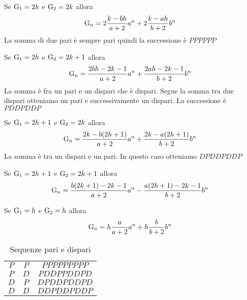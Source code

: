 \begin{commento}
	Se $\operatorname{G}_{1}={}2h$ e $\operatorname{G}_{2}={}2k$ allora \begin{equation}
		\operatorname{G}_{n}={}2\dfrac{k-bh}{a+2}a^n+2\dfrac{k-ah}{b+2}b^n
	\end{equation}
La somma di due pari è sempre pari quindi la successione è $PPPPPP$
\end{commento}
\begin{commento}
	Se $\operatorname{G}_{1}={}2h$ e $\operatorname{G}_{2}={}2k+1$ allora \begin{equation}
		\operatorname{G}_{n}={}\dfrac{2bh-2k-1}{a+2}a^n+\dfrac{2ah-2k-1}{b+2}b^n
	\end{equation}
La somma è fra un pari e un dispari che è dispari. Segue la somma tra due dispari otteniamo un pari e successivamente un dispari. La successione è $PDDPDDP$
\end{commento}
\begin{commento}
	Se $\operatorname{G}_{1}={}2h+1$ e $\operatorname{G}_{2}={}2k$ allora \begin{equation}
		\operatorname{G}_{n}={}\dfrac{2k-b(2h+1)}{a+2}a^n+\dfrac{2k-a(2h+1)}{b+2}b^n
	\end{equation}
La somma è tra un dispari e un pari. In questo caso otteniamo $DPDDPDDP$
\end{commento}
\begin{commento}
	Se $\operatorname{G}_{1}={}2h+1$ e $\operatorname{G}_{2}={}2k+1$ allora \begin{equation}
		\operatorname{G}_{n}={}\dfrac{b(2k+1)-2k-1}{a+2}a^n-\dfrac{a(2h+1)-2k-1}{b+2}b^n
	\end{equation}
\end{commento}
\begin{commento}
	Se $\operatorname{G}_{1}={}h$ e $\operatorname{G}_{2}={}h$ allora \begin{equation}
		\operatorname{G}_{n}={}h\dfrac{a}{a+2}a^n+h\dfrac{b}{b+2}b^n
	\end{equation}
\end{commento}
\begin{table}
	\centering
	\begin{tabular}{ccc}
\toprule
	$P$& $P$ &$PPPPPPPPP$ \\
	$P$& $D$ &$PDDPPDDPD$  \\
	$D$& $P$ &$DPDDPDDPD$  \\
	$D$& $D$ &$DDPDDPDDP$  \\
\bottomrule
\end{tabular}
	\caption{Sequenze pari e dispari}
\end{table}
